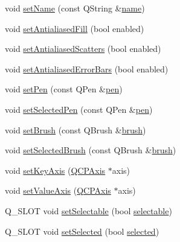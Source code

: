 \begin{DoxyCompactItemize}
\item 
void \hyperlink{class_q_c_p_abstract_plottable_ab79c7ba76bc7fa89a4b3580e12149f1f}{set\-Name} (const Q\-String \&\hyperlink{class_q_c_p_abstract_plottable_a1affc1972938e4364a9325e4e4e4dcea}{name})
\item 
void \hyperlink{class_q_c_p_abstract_plottable_a089d6b5577120239b55c39ed27c39536}{set\-Antialiased\-Fill} (bool enabled)
\item 
void \hyperlink{class_q_c_p_abstract_plottable_a2f03f067ede2ed4da6f7d0e4777a3f02}{set\-Antialiased\-Scatters} (bool enabled)
\item 
void \hyperlink{class_q_c_p_abstract_plottable_a757beb744b96cf1855cca5ab9d3ecf52}{set\-Antialiased\-Error\-Bars} (bool enabled)
\item 
void \hyperlink{class_q_c_p_abstract_plottable_ab74b09ae4c0e7e13142fe4b5bf46cac7}{set\-Pen} (const Q\-Pen \&\hyperlink{class_q_c_p_abstract_plottable_a41d060007cc6b3037c9c04d22d0c0398}{pen})
\item 
void \hyperlink{class_q_c_p_abstract_plottable_a6911603cad23ab0469b108224517516f}{set\-Selected\-Pen} (const Q\-Pen \&\hyperlink{class_q_c_p_abstract_plottable_a41d060007cc6b3037c9c04d22d0c0398}{pen})
\item 
void \hyperlink{class_q_c_p_abstract_plottable_a7a4b92144dca6453a1f0f210e27edc74}{set\-Brush} (const Q\-Brush \&\hyperlink{class_q_c_p_abstract_plottable_aa74cdceb9c7286ef116fbfa58e0326e7}{brush})
\item 
void \hyperlink{class_q_c_p_abstract_plottable_ae8c816874089f7a44001e8618e81a9dc}{set\-Selected\-Brush} (const Q\-Brush \&\hyperlink{class_q_c_p_abstract_plottable_aa74cdceb9c7286ef116fbfa58e0326e7}{brush})
\item 
void \hyperlink{class_q_c_p_abstract_plottable_a8524fa2994c63c0913ebd9bb2ffa3920}{set\-Key\-Axis} (\hyperlink{class_q_c_p_axis}{Q\-C\-P\-Axis} $\ast$axis)
\item 
void \hyperlink{class_q_c_p_abstract_plottable_a71626a07367e241ec62ad2c34baf21cb}{set\-Value\-Axis} (\hyperlink{class_q_c_p_axis}{Q\-C\-P\-Axis} $\ast$axis)
\item 
Q\-\_\-\-S\-L\-O\-T void \hyperlink{class_q_c_p_abstract_plottable_a22c69299eb5569e0f6bf084877a37dc4}{set\-Selectable} (bool \hyperlink{class_q_c_p_abstract_plottable_af895574da1ec0d050711b6c9deda296a}{selectable})
\item 
Q\-\_\-\-S\-L\-O\-T void \hyperlink{class_q_c_p_abstract_plottable_afbd5428c2952f59d952e11ab5cd79176}{set\-Selected} (bool \hyperlink{class_q_c_p_abstract_plottable_ab901903adcb0e29467d63de72340ab29}{selected})

\end{DoxyCompactItemize}
